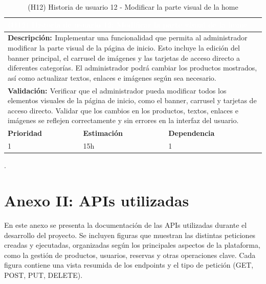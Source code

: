 \begin{table}[H]
  \centering
  \renewcommand{\arraystretch}{1.5}
  \begin{tabular}{|p{}|p{}|p{}|}
    \hline
    \multicolumn{3}{|l|}{\cellcolor{OrangeVIU}\textcolor{white}{\textbf{(H12) Historia de usuario 12: Modificar la parte visual de la home}}} \\
    \hline
    \multicolumn{3}{|p{\dimexpr0.9\linewidth+2\tabcolsep+2\arrayrulewidth}|}{{\textbf{\textcolor{naranja}{Descripción: }}}Implementar una funcionalidad que permita al administrador modificar la parte visual de la página de inicio. Esto incluye la edición del banner principal, el carrusel de imágenes y las tarjetas de acceso directo a diferentes categorías. El administrador podrá cambiar los productos mostrados, así como actualizar textos, enlaces e imágenes según sea necesario.} \\
    \hline
    \multicolumn{3}{|p{\dimexpr0.9\linewidth+2\tabcolsep+2\arrayrulewidth}|}{{\textbf{\textcolor{naranja}{Validación: }} Verificar que el administrador pueda modificar todos los elementos visuales de la página de inicio, como el banner, carrusel y tarjetas de acceso directo. Validar que los cambios en los productos, textos, enlaces e imágenes se reflejen correctamente y sin errores en la interfaz del usuario.}} \\
    \hline
    {\textbf{\textcolor{naranja}{Prioridad }}}  & {\textbf{\textcolor{naranja}{Estimación }}}  & {\textbf{\textcolor{naranja}{Dependencia }}}  \\
    \hline
    1 &  15h &  1 \\
    \hline
  \end{tabular}
  \caption{(H12) Historia de usuario 12 - Modificar la parte visual de la home}
  \label{table:H12}
\end{table}


.
\chapter{Anexo II: APIs utilizadas}\label{cap:anexo2}

En este anexo se presenta la documentación de las APIs utilizadas durante el desarrollo del proyecto. Se incluyen figuras que muestran las distintas peticiones creadas y ejecutadas, organizadas según los principales aspectos de la plataforma, como la gestión de productos, usuarios, reservas y otras operaciones clave. Cada figura contiene una vista resumida de los endpoints y el tipo de petición (GET, POST, PUT, DELETE).

